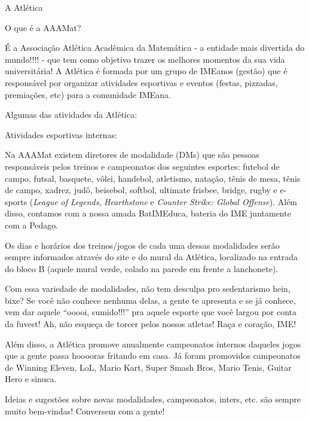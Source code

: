 ﻿\begin{secao}{A Atlética} %

\begin{subsecao}{O que é a AAAMat?}

É a Associação Atlética Acadêmica da Matemática - a entidade mais divertida do
mundo!!!! - que tem como objetivo trazer os melhores momentos da sua vida
universitária! A Atlética é formada por um grupo de IMEanos (gestão) que é
responsável por organizar atividades esportivas e eventos (festas, pizzadas,
premiações, etc) para a comunidade IMEana.

\end{subsecao}

Algumas das atividades da Atlética:

\begin{subsecao}{Atividades esportivas internas:}

Na AAAMat existem diretores de modalidade (DMs) que são pessoas responsáveis
pelos treinos e campeonatos dos seguintes esportes: futebol de campo, futsal,
basquete, vôlei, handebol, atletismo, natação, tênis de mesa, tênis de campo,
xadrez, judô, beisebol, softbol, ultimate frisbee, bridge, rugby e e-sports
(\textit{League of Legends}, \textit{Hearthstone} e
\textit{Counter Strike: Global Offense}). Além disso, contamos com a nossa 
amada BatIMEduca, bateria do IME juntamente com a Pedago.

Os dias e horários dos treinos/jogos de cada uma dessas modalidades serão
sempre informados através do site e do mural da Atlética, localizado na entrada
do bloco B (aquele mural verde, colado na parede em frente a lanchonete).

Com essa variedade de modalidades, não tem desculpa pro sedentarismo hein,
bixe? Se você não conhece nenhuma delas, a gente te apresenta e se já conhece,
vem dar aquele “ooooi, sumido!!!” pra aquele esporte que você largou por conta
da fuvest! Ah, não esqueça de torcer pelos nossos atletas! Raça e coração, IME!

Além disso, a Atlética promove anualmente campeonatos internos daqueles jogos
que a gente passa hooooras fritando em casa. Já foram promovidos campeonatos de
Winning Eleven, LoL, Mario Kart, Super Smash Bros, Mario Tenis, Guitar Hero e
sinuca.

Ideias e sugestões sobre novas modalidades, campeonatos, inters, etc. são
sempre muito bem-vindas! Conversem com a gente!


\end{subsecao}
\end{secao}
